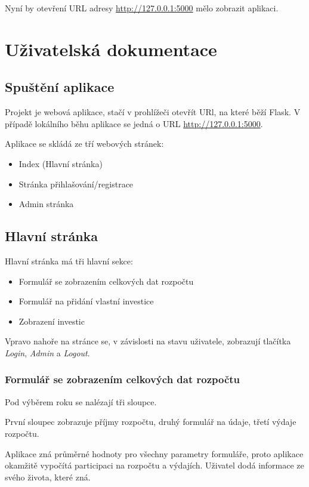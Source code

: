 \documentclass[11pt,a4paper,twoside,openright]{report}
\begin{document}
Nyní by otevření URL adresy \url{http://127.0.0.1:5000} mělo zobrazit aplikaci.

\section{Uživatelská dokumentace}
\subsection{Spuštění aplikace}
Projekt je webová aplikace, stačí v prohlížeči otevřít URl, na které běží Flask.
V případě lokálního běhu aplikace se jedná o URL \url{http://127.0.0.1:5000}.

Aplikace se skládá ze tří webových stránek:

\begin{itemize}
  \item Index (Hlavní stránka)
  \item Stránka přihlašování/registrace
  \item Admin stránka
\end{itemize}

\subsection{Hlavní stránka}

Hlavní stránka má tři hlavní sekce:

\begin{itemize}
  \item Formulář se zobrazením celkových dat rozpočtu
  \item Formulář na přidání vlastní investice
  \item Zobrazení investic
\end{itemize}

Vpravo nahoře na stránce se, v závislosti na stavu uživatele, zobrazují
tlačítka \emph{Login}, \emph{Admin} a \emph{Logout}.

\subsubsection{Formulář se zobrazením celkových dat rozpočtu}

Pod výběrem roku se nalézají tři sloupce.

První sloupec zobrazuje příjmy rozpočtu, druhý formulář na údaje, třetí
výdaje rozpočtu.

Aplikace zná průměrné hodnoty pro všechny parametry formuláře, proto aplikace
okamžitě vypočítá participaci na rozpočtu a výdajích. Uživatel dodá informace
ze svého života, které zná.
\end{document}
